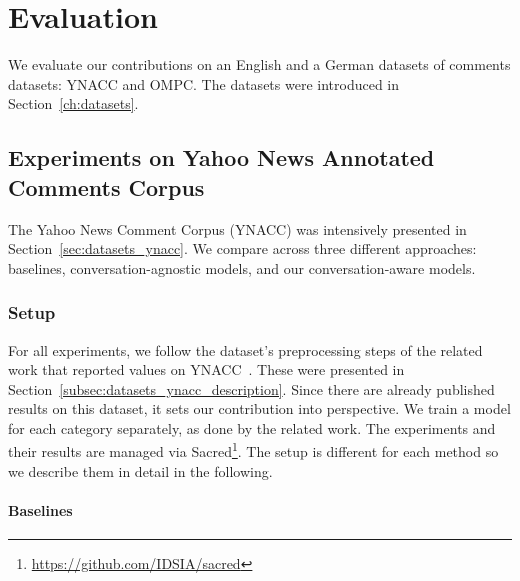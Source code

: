 \chapter{Evaluation}
\label{sec:evaluation}

We evaluate our contributions on an English and a German datasets of comments datasets: YNACC and OMPC.
The datasets were introduced in Section~\ref{ch:datasets}.

\section{Experiments on Yahoo News Annotated Comments Corpus}

The Yahoo News Comment Corpus (YNACC) was intensively presented in Section~\ref{sec:datasets_ynacc}. We compare across three different approaches: baselines, conversation-agnostic models, and our conversation-aware models. 
\subsection{Setup}

For all experiments, we follow the dataset's preprocessing steps of the related work that reported values on YNACC~\cite{napoles2017finding}.
These were presented in Section~\ref{subsec:datasets_ynacc_description}.
Since there are already published results on this dataset, it sets our contribution into perspective.
We train a model for each category separately, as done by the related work.
The experiments and their results are managed via Sacred\footnote{\url{https://github.com/IDSIA/sacred}}.
The setup is different for each method so we describe them in detail in the following.

\subsubsection{Baselines}


